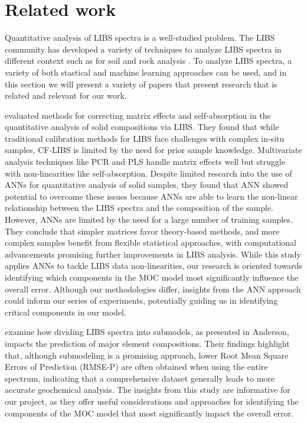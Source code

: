 \section{Related work}\label{sec:related_works}
Quantitative analysis of LIBS spectra is a well-studied problem.
The LIBS community has developed a variety of techniques to analyze LIBS spectra in different context such as for soil and rock analysis \cite{huang_progress_2023}.
To analyze LIBS spectra, a variety of both stastical and machine learning approaches can be used, and in this section we will present a variety of papers that present research that is related and relevant for our work.

\citeauthor{takahashi_quantitative_2017} evaluated methods for correcting matrix effects and self-absorption in the quantitative analysis of solid compositions via LIBS.
They found that while traditional calibration methods for LIBS face challenges with complex in-situ samples, CF-LIBS is limited by the need for prior sample knowledge.
Multivariate analysis techniques like PCR and PLS handle matrix effects well but struggle with non-linearities like self-absorption.
Despite limited research into the use of ANNs for quantitative analysis of solid samples, they found that ANN showed potential to overcome these issues because ANNs are able to learn the non-linear relationship between the LIBS spectra and the composition of the sample.
However, ANNs are limited by the need for a large number of training samples.
They conclude that simpler matrices favor theory-based methods, and more complex samples benefit from flexible statistical approaches, with computational advancements promising further improvements in LIBS analysis\cite{takahashi_quantitative_2017}.
While this study applies ANNs to tackle LIBS data non-linearities, our research is oriented towards identifying which components in the MOC model most significantly influence the overall error. Although our methodologies differ, insights from the ANN approach could inform our series of experiments, potentially guiding us in identifying critical components in our model.

\citeauthor{lepore_quantitative_2022} examine how dividing LIBS spectra into submodels, as presented in Anderson, impacts the prediction of major element compositions.
Their findings highlight that, although submodeling is a promising approach, lower Root Mean Square Errors of Prediction (RMSE-P) are often obtained when using the entire spectrum, indicating that a comprehensive dataset generally leads to more accurate geochemical analysis\cite{lepore_quantitative_2022}.
The insights from this study are informative for our project, as they offer useful considerations and approaches for identifying the components of the MOC model that most significantly impact the overall error.

